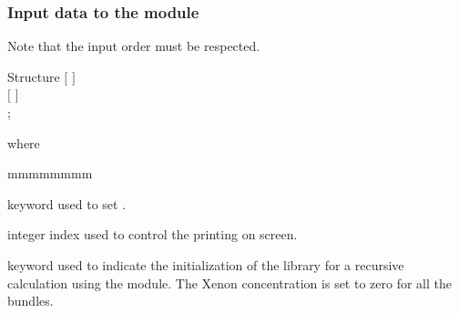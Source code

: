 \vskip 0.2cm
\subsubsection{Input data to the  module}\label{sect:strxenon}

\noindent
Note that the input order must be respected.

\begin{DataStructure}{Structure }
$[$   $]$ \\
$[$  $]$ \\
;
\end{DataStructure}

\noindent where
\begin{ListeDeDescription}{mmmmmmmm}

\item[\moc{EDIT}] keyword used to set .

\item[\dusa{iprint}] integer index used to control the printing on screen.

\item[\moc{INIT}] keyword used to indicate the initialization of the library for a recursive calculation using the  module. The Xenon concentration is set to zero for all the bundles.

\end{ListeDeDescription}
\clearpage
